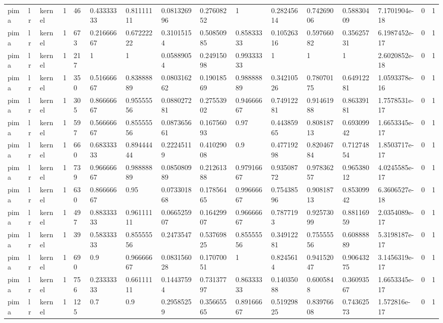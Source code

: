 \begin{tabular}{llllllllllllllll}
pima & lr & kernel & 1 & 46 & 0.43333333 & 0.81111111 & 0.081326996 & 0.27608252 & 1 & 0.28245614 & 0.74269006 & 0.58830409 & 7.1701904e-18 & 0 & 1 \\
pima & lr & kernel & 1 & 673 & 0.21666667 & 0.67222222 & 0.31015154 & 0.50850985 & 0.85833333 & 0.10526316 & 0.59766082 & 0.35625731 & 6.1987452e-17 & 0 & 1 \\
pima & lr & kernel & 1 & 217 & 1 & 1 & 0.05889054 & 0.24915098 & 0.99333333 & 1 & 1 & 1 & 2.6020852e-18 & 0 & 1 \\
pima & lr & kernel & 1 & 350 & 0.51666667 & 0.83888889 & 0.080316262 & 0.19018569 & 0.98888889 & 0.34210526 & 0.78070175 & 0.64912281 & 1.0593378e-16 & 0 & 1 \\
pima & lr & kernel & 1 & 305 & 0.86666667 & 0.95555556 & 0.088027281 & 0.27553902 & 0.94666667 & 0.74912281 & 0.91461988 & 0.86339181 & 1.7578531e-17 & 0 & 1 \\
pima & lr & kernel & 1 & 597 & 0.56666667 & 0.85555556 & 0.087365661 & 0.16756093 & 0.97 & 0.44385965 & 0.80818713 & 0.69309942 & 1.6653345e-17 & 0 & 1 \\
pima & lr & kernel & 1 & 660 & 0.68333333 & 0.89444444 & 0.22245119 & 0.41029008 & 0.9 & 0.47719298 & 0.82046784 & 0.71274854 & 1.8503717e-17 & 0 & 1 \\
pima & lr & kernel & 1 & 739 & 0.96666667 & 0.98888889 & 0.085080989 & 0.21261388 & 0.97916667 & 0.93508772 & 0.97836257 & 0.96538012 & 4.0245585e-17 & 0 & 1 \\
pima & lr & kernel & 1 & 630 & 0.86666667 & 0.95 & 0.073301868 & 0.17856465 & 0.99666667 & 0.75438596 & 0.90818713 & 0.85309942 & 6.3606527e-18 & 0 & 1 \\
pima & lr & kernel & 1 & 497 & 0.88333333 & 0.96111111 & 0.066525907 & 0.16429907 & 0.96666667 & 0.7877193 & 0.92573099 & 0.88116959 & 2.0354089e-17 & 0 & 1 \\
pima & lr & kernel & 1 & 39 & 0.58333333 & 0.85555556 & 0.2473547 & 0.53769825 & 0.85555556 & 0.34912281 & 0.75555556 & 0.60888889 & 5.3198187e-17 & 0 & 1 \\
pima & lr & kernel & 1 & 690 & 0.9 & 0.96666667 & 0.083156028 & 0.17070051 & 1 & 0.8245614 & 0.94152047 & 0.90643275 & 3.1456319e-17 & 0 & 1 \\
pima & lr & kernel & 1 & 756 & 0.23333333 & 0.66111111 & 0.14437594 & 0.73137797 & 0.86333333 & 0.14035088 & 0.6005848 & 0.36093567 & 1.6653345e-17 & 0 & 1 \\
pima & lr & kernel & 1 & 125 & 0.7 & 0.9 & 0.29585259 & 0.35665565 & 0.89166667 & 0.51929825 & 0.83976608 & 0.74362573 & 1.572816e-17 & 0 & 1 \\

\end{tabular}
